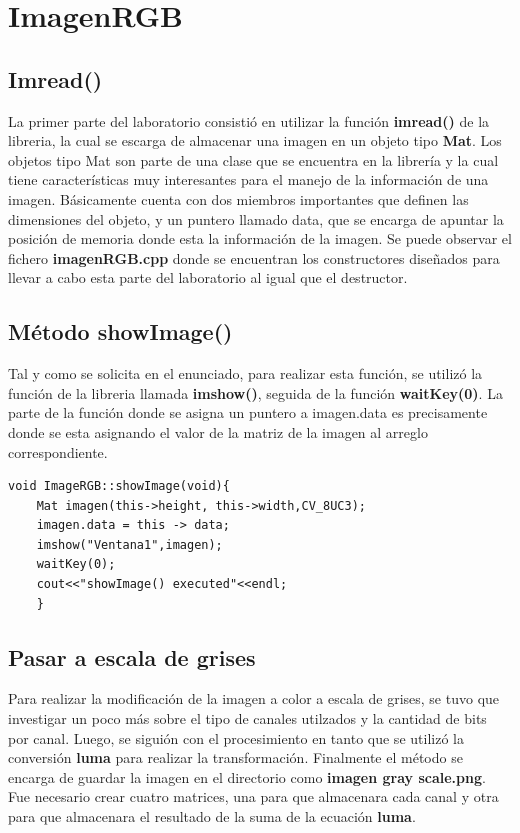 \documentclass{article}
\begin{document}
\section{ImagenRGB}
\subsection{Imread()}
La primer parte del laboratorio consisti\' o en utilizar la funci\' on \textbf{imread()} de la libreria, la cual se escarga de almacenar una imagen en un objeto tipo \textbf{Mat}. Los objetos tipo Mat son parte de una clase que se encuentra en la librer\' ia y la cual tiene caracter\' isticas muy interesantes para el manejo de la informaci\' on de una imagen. B\' asicamente cuenta con dos miembros importantes que definen las dimensiones del objeto, y un puntero llamado data, que se encarga de apuntar la posici\' on de memoria donde esta la informaci\' on de la imagen. 
Se puede observar el fichero \textbf{imagenRGB.cpp} donde se encuentran los constructores dise\~ nados para llevar a cabo esta parte del laboratorio al igual que el destructor.

\subsection{M\' etodo showImage()}
Tal y como se solicita en el enunciado, para realizar esta funci\' on, se utiliz\' o la funci\' on de la libreria llamada \textbf{imshow()}, seguida de la funci\' on \textbf{waitKey(0)}. La parte de la funci\' on donde se asigna un puntero a imagen.data es precisamente donde se esta asignando el valor de la matriz de la imagen al arreglo correspondiente.
\begin{verbatim}
void ImageRGB::showImage(void){
	Mat imagen(this->height, this->width,CV_8UC3);
	imagen.data = this -> data;
	imshow("Ventana1",imagen);
	waitKey(0);
	cout<<"showImage() executed"<<endl;
	}
\end{verbatim}

\subsection{Pasar a escala de grises}
Para realizar la modificaci\' on de la imagen a color a escala de grises, se tuvo que investigar un poco m\' as sobre el tipo de canales utilzados y la cantidad de bits por canal. Luego, se sigui\' on con el procesimiento en tanto que se utiliz\' o la conversi\' on \textbf{luma} para realizar la transformaci\' on. Finalmente el m\' etodo se encarga de guardar la imagen en el directorio como \textbf{imagen gray scale.png}.
Fue necesario crear cuatro matrices, una para que almacenara cada canal y otra para que almacenara el resultado de la suma de la ecuaci\' on \textbf{luma}.
\end{document}
